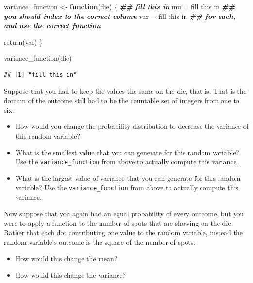 \documentclass[
]{book}
\newenvironment{Shaded}{\begin{snugshade}}{\end{snugshade}}
\newcommand{\ControlFlowTok}[1]{\textcolor[rgb]{0.13,0.29,0.53}{\textbf{#1}}}
\newcommand{\DocumentationTok}[1]{\textcolor[rgb]{0.56,0.35,0.01}{\textbf{\textit{#1}}}}
\newcommand{\FunctionTok}[1]{\textcolor[rgb]{0.00,0.00,0.00}{#1}}
\newcommand{\NormalTok}[1]{#1}
\newcommand{\OtherTok}[1]{\textcolor[rgb]{0.56,0.35,0.01}{#1}}
\newcommand{\StringTok}[1]{\textcolor[rgb]{0.31,0.60,0.02}{#1}}
\providecommand{\tightlist}{%
  \setlength{\itemsep}{0pt}\setlength{\parskip}{0pt}}
\theoremstyle{definition}
\theoremstyle{definition}
\theoremstyle{definition}
\theoremstyle{definition}
\theoremstyle{remark}
\begin{document}
\begin{Shaded}
\begin{Highlighting}[]
\NormalTok{variance\_function }\OtherTok{\textless{}{-}} \ControlFlowTok{function}\NormalTok{(die) \{ }
  \DocumentationTok{\#\# fill this in}
\NormalTok{  mu }\OtherTok{=} \StringTok{\textquotesingle{}fill this in\textquotesingle{}}   \DocumentationTok{\#\# you should index to the correct column}
\NormalTok{  var }\OtherTok{=} \StringTok{\textquotesingle{}fill this in\textquotesingle{}}  \DocumentationTok{\#\# for each, and use the correct function}
  
  \FunctionTok{return}\NormalTok{(var)}
\NormalTok{\}}

\FunctionTok{variance\_function}\NormalTok{(die)}
\end{Highlighting}
\end{Shaded}

\begin{verbatim}
## [1] "fill this in"
\end{verbatim}

Suppose that you had to keep the values the same on the die, that is. That is the domain of the outcome still had to be the countable set of integers from one to six.

\begin{itemize}
\tightlist
\item
  How would you change the probability distribution to decrease the variance of this random variable?
\item
  What is the smallest value that you can generate for this random variable? Use the \texttt{variance\_function} from above to actually compute this variance.
\item
  What is the largest value of variance that you can generate for this random variable? Use the \texttt{variance\_function} from above to actually compute this variance.
\end{itemize}

Now suppose that you again had an equal probability of every outcome, but you were to apply a function to the number of spots that are showing on the die. Rather that each dot contributing one value to the random variable, instead the random variable's outcome is the square of the number of spots.

\begin{itemize}
\tightlist
\item
  How would this change the mean?\\
\item
  How would this change the variance?
\end{itemize}
\end{document}
